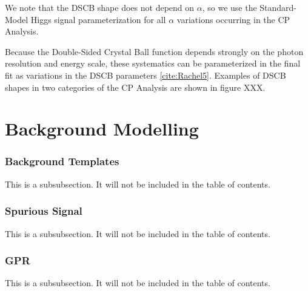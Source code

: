 We note that the DSCB shape does not depend on $\alpha$, so we use the Standard-Model Higgs signal parameterization for all $\alpha$ variations occurring in the CP Analysis.

Because the Double-Sided Crystal Ball function depends strongly on the photon resolution and energy scale, these systematics can be parameterized in the final fit as variations in the DSCB parameters \ref{cite:Rachel5}. Examples of DSCB shapes in two categories of the CP Analysis are shown in figure XXX.

\begin{figure}
\end{figure}

\section{Background Modelling} \label{sec:background_modelling} 







\subsubsection{Background Templates} \label{sec:bkgtemplates} 



This is a subsubsection. It will not be included in the table of contents. 

\subsubsection{Spurious Signal} \label{sec:spurious signal}

This is a subsubsection. It will not be included in the table of contents.

\subsubsection{GPR} \label{sec:gpr}

This is a subsubsection. It will not be included in the table of contents.
